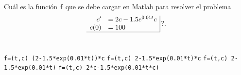 \begin{pregunta}
\begin{cuerpo}
\textquestiondown  Cu\'al es la funci\'on \texttt{f} que se debe cargar en Matlab para resolver el problema
$$
\begin{array}{rl|}
c'	&=2c-1.5e^{0.01t}c\\
c(0)	&=100\\ \hline
\end{array}\,?.
$$
\\
\end{cuerpo}

\begin{multicols}{2}
\begin{alternativas}
{\texttt{f=(t,c) (2-1.5*exp(0.01*t))*c}}
{\texttt{f=(t,c) 2-1.5*exp(0.01*t)*c}}
{\texttt{f=(t,c) 2-1.5*exp(0.01*t)}}
{\texttt{f=(t,c) 2*c-1.5*exp(0.01*t*c)}}
\end{alternativas}
\end{multicols}
\justificacion{5cm}
\end{pregunta}